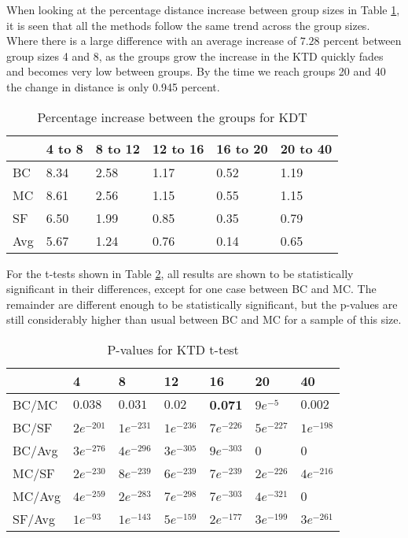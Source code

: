 When looking at the percentage distance increase between group sizes in Table \ref{tbl:kendall}, it is seen that all the methods follow the same trend across the group sizes. Where there is a large difference with an average increase of $7.28$ percent between group sizes 4 and 8, as the groups grow the increase in the KTD quickly fades and becomes very low between groups. By the time we reach groups 20 and 40 the change in distance is only 0.945 percent.

\begin{table}[H]
	\centering
	\begin{tabular}{|l|lllll|}\hline
		& 4 to 8 & 8 to 12 & 12 to 16 & 16 to 20 & 20 to 40 \\\hline
		BC 	& 8.34	& 2.58	& 1.17  & 0.52	& 1.19 \\
		MC  & 8.61 	& 2.56	& 1.15	& 0.55	& 1.15 \\
		SF  & 6.50	& 1.99	& 0.85	& 0.35	& 0.79 \\
		Avg	& 5.67	& 1.24 	& 0.76	& 0.14	& 0.65 \\ \hline
	\end{tabular}
	\caption{Percentage increase between the groups for KDT}
	\label{tbl:kendall}
\end{table}

For the t-tests shown in Table \ref{tbl:ktd_ttest}, all results are shown to be statistically significant in their differences, except for one case between BC and MC. The remainder are different enough to be statistically significant, but the p-values are still considerably higher than usual between BC and MC for a sample of this size.

\begin{table}[H]
	\centering
	\begin{tabular}{|l|llllll|}\hline
		& 4 & 8 & 12 & 16 & 20 & 40 \\\hline
		BC/MC	& $0.038$	& $0.031$	& $0.02$	& \textbf{0.071}	& $9e^{-5}$	& $0.002$ \\
		BC/SF	& $2e^{-201}$	& $1e^{-231}$	& $1e^{-236}$	& $7e^{-226}$ & $5e^{-227}$ & $1e^{-198}$ \\
		BC/Avg	& $3e^{-276}$	& $4e^{-296}$ 	& $3e^{-305}$	& $9e^{-303}$	& 0 & 0 \\
		MC/SF	& $2e^{-230}$	& $8e^{-239}$ 	& $6e^{-239}$	& $7e^{-239}$	& $2e^{-226}$ & $4e^{-216}$ \\
		MC/Avg	& $4e^{-259}$	& $2e^{-283}$ 	& $7e^{-298}$	& $7e^{-303}$ & $4e^{-321}$ & 0 \\
		SF/Avg	& $1e^{-93}$	& $1e^{-143}$ 	& $5e^{-159}$	& $2e^{-177}$	& $3e^{-199}$ & $3e^{-261}$ \\ \hline
	\end{tabular}
	\caption{P-values for KTD t-test}
	\label{tbl:ktd_ttest}
\end{table}
